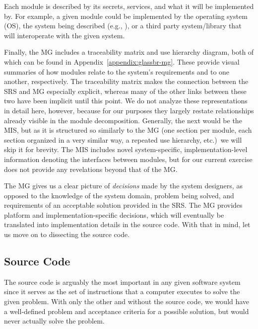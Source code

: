 Each module is described by its secrets, services, and what it will be 
implemented by. For example, a given module could be implemented by the 
operating system (OS), the system being described (e.g., \gb{}), or a third party
system/library that will interoperate with the given system.

Finally, the MG includes a traceability matrix and use hierarchy diagram, both 
of which can be found in Appendix~\ref{appendix:glassbr-mg}. 
These provide visual summaries of how modules relate to the system's 
requirements and to one another, respectively. The traceability matrix makes 
the connection between the SRS and MG especially explicit, whereas many of the 
other links between these two \sfs{} have been implicit until this point. We do 
not analyze these representations in detail here, however, because for our 
purposes they largely restate relationships already visible in the module 
decomposition. Generally, the next \sf{} would be the MIS, but as it is 
structured so similarly to the MG (one section per module, each section 
organized in a very similar way, a repeated use hierarchy, etc.)\ we will skip 
it for brevity. The MIS includes novel system-specific, implementation-level 
information denoting the interfaces between modules, but for our current 
exercise does not provide any revelations beyond that of the MG.

The MG gives us a clear picture of \textit{decisions} made by the system 
designers, as opposed to the knowledge of the system domain, problem being 
solved, and requirements of an acceptable solution provided in the SRS. The MG 
provides platform and implementation-specific decisions, which will eventually 
be translated into implementation details in the source code. With that in 
mind, let us move on to dissecting the source code.

\subsection{Source Code}
\label{sec:breakdown:code}

The source code is arguably the most important \sf{} in any given software 
system since it serves as the set of instructions that a computer executes
to solve the given problem. With only the other \sfs{} and without the 
source code, we would have a well-defined problem and acceptance criteria 
for a possible solution, but would never actually solve the problem.

